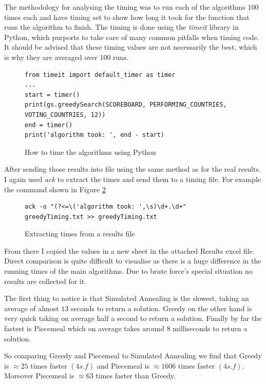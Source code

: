 \documentclass[12pt]{report}
\begin{document}
The methodology for analysing the timing was to run each of the algorithms 100 times each and have timing set to show how long it took for the function that runs the algorithm to finish. The timing is done using the \textit{timeit}\cite{PythonTimeit} library in Python, which purports to take care of many common pitfalls when timing code. It should be advised that these timing values are not necessarily the best, which is why they are averaged over 100 runs.

\begin{figure}[H]
\caption{How to time the algorithms using Python}
\label{timingCode}
\begin{verbatim}
from timeit import default_timer as timer
...
start = timer()
print(gs.greedySearch(SCOREBOARD, PERFORMING_COUNTRIES, VOTING_COUNTRIES, 12))
end = timer()
print('algorithm took: ', end - start)
\end{verbatim}
\end{figure}

After sending those results into file using the same method as for the real results. I again used \textit{ack} to extract the times and send them to a timing file. For example the command shown in Figure \ref{timingAck}

\begin{figure}[H]
\caption{Extracting times from a results file}
\label{timingAck}
\begin{verbatim}
ack -o "(?<=\('algorithm took: ',\s)\d+.\d+" greedyTiming.txt >> greedyTiming.txt
\end{verbatim}
\end{figure}

From there I copied the values in a new sheet in the attached Results excel file. Direct comparison is quite difficult to visualise as there is a huge difference in the running times of the main algorithms. Due to brute force's special situation no results are collected for it.

The first thing to notice is that Simulated Annealing is the slowest, taking an average of almost $13$ seconds to return a solution. Greedy on the other hand is very quick taking on average half a second to return a solution. Finally by far the fastest is Piecemeal which on average takes around $8$ milliseconds to return a solution.

So comparing Greedy and Piecemeal to Simulated Annealing we find that Greedy is $\approx 25$ times faster $(4 s.f)$ and Piecemeal is $\approx 1606$ times faster $(4 s.f)$. Moreover Piecemeal is $\approx 63$ times faster than Greedy.
\end{document}
